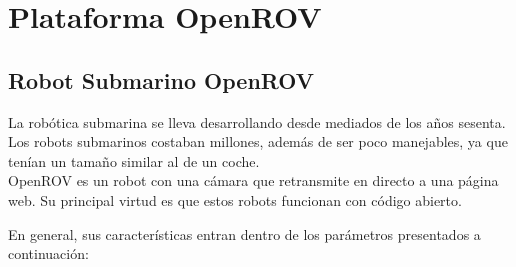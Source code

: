 \chapter{Plataforma OpenROV}
\label{cap:plataformaOpenROV}

\section{Robot Submarino OpenROV}
\label{cap:Robot Submarino OpenROV}
La robótica submarina se lleva desarrollando desde mediados de los años sesenta. Los robots submarinos costaban millones, además de ser poco manejables, ya que tenían un tamaño similar al de un coche. 
\\OpenROV\cite{openrov} es un robot con una cámara que retransmite en directo a una página web. Su principal virtud es que estos robots funcionan con código abierto.

En general, sus características entran dentro de los parámetros presentados a continuación:

